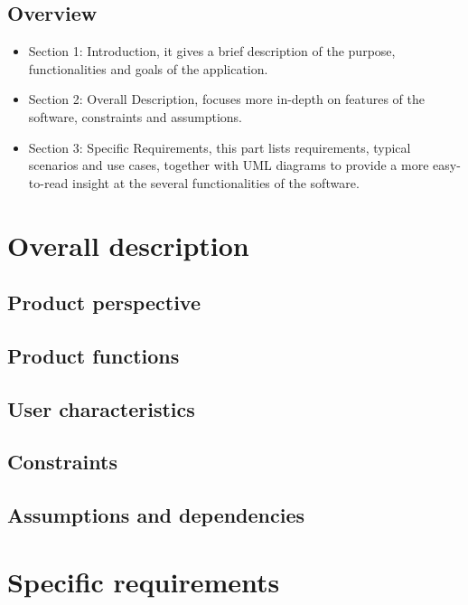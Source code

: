 \documentclass[a4paper,11pt]{report} %
\begin{document}
	\subsection{Overview}
		\begin{itemize}
			\item Section 1: Introduction, it gives a brief description of the purpose, functionalities and goals of the application.
			\item Section 2: Overall Description, focuses more in-depth on features of the software, constraints and assumptions.
			\item Section 3: Specific Requirements, this part lists requirements, typical scenarios	and use cases, together with UML diagrams to provide a more easy-to-read insight at the several functionalities of the software.
		\end{itemize}
	
	
	
	\section{Overall description}
	
	\subsection{Product perspective}
	
	\subsection{Product functions}
	
	\subsection{User characteristics}
	
	\subsection{Constraints}
	
	\subsection{Assumptions and dependencies}
	
	
	
	\section{Specific requirements}
	
\end{document}
